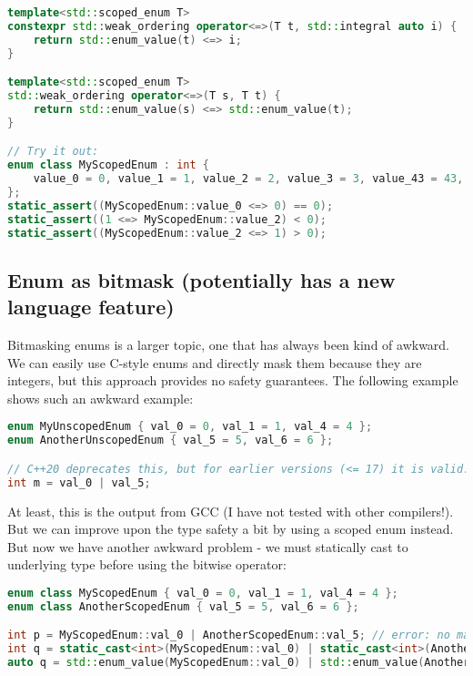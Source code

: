 \documentclass[
  format=manuscript,
  screen=true,
  review=false,
  nonacm=true,
  timestamp=true,
  balance=false]{acmart}
\newcommand{\beforecodespace}{\vspace{4mm}}
\begin{document}
\begin{lstlisting}[language=Cpp]
template<std::scoped_enum T>
constexpr std::weak_ordering operator<=>(T t, std::integral auto i) {
    return std::enum_value(t) <=> i;
}

template<std::scoped_enum T>
std::weak_ordering operator<=>(T s, T t) {
    return std::enum_value(s) <=> std::enum_value(t);
}

// Try it out:
enum class MyScopedEnum : int {
    value_0 = 0, value_1 = 1, value_2 = 2, value_3 = 3, value_43 = 43, value_57 = 57
};
static_assert((MyScopedEnum::value_0 <=> 0) == 0);
static_assert((1 <=> MyScopedEnum::value_2) < 0);
static_assert((MyScopedEnum::value_2 <=> 1) > 0);
\end{lstlisting}


\subsection{Enum as bitmask (potentially has a new language feature)}

Bitmasking enums is a larger topic, one that has always been kind of awkward.
We can easily use C-style enums and directly mask them because they are integers,
but this approach provides no safety guarantees. The following example shows such
an awkward example:

\beforecodespace\begin{lstlisting}[language=Cpp]
enum MyUnscopedEnum { val_0 = 0, val_1 = 1, val_4 = 4 };
enum AnotherUnscopedEnum { val_5 = 5, val_6 = 6 };

// C++20 deprecates this, but for earlier versions (<= 17) it is valid.
int m = val_0 | val_5;
\end{lstlisting}

\noindent
At least, this is the output from GCC (I have not tested with other compilers!).
But we can improve upon the type safety a bit by using a scoped enum instead.
But now we have another awkward problem - we must statically cast to underlying
type before using the bitwise operator:

\beforecodespace\begin{lstlisting}[language=Cpp]
enum class MyScopedEnum { val_0 = 0, val_1 = 1, val_4 = 4 };
enum class AnotherScopedEnum { val_5 = 5, val_6 = 6 };

int p = MyScopedEnum::val_0 | AnotherScopedEnum::val_5; // error: no match for 'operator|'
int q = static_cast<int>(MyScopedEnum::val_0) | static_cast<int>(AnotherScopedEnum::val_5); // valid
auto q = std::enum_value(MyScopedEnum::val_0) | std::enum_value(AnotherScopedEnum::val_5); // same
\end{lstlisting}
\end{document}
